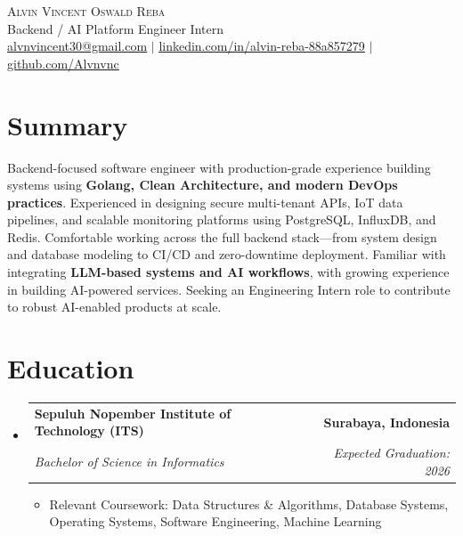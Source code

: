 \documentclass[letterpaper,11pt]{article}
\makeatletter
\newcommand{\resumeItem}[1]{
  \item\small{
    {#1 \vspace{-2pt}}
  }
}
\newcommand{\resumeSubheading}[4]{
  \vspace{-2pt}\item
    \begin{tabular*}{1.0\textwidth}[t]{l@{\extracolsep{\fill}}r}
      \textbf{#1} & \textbf{\small #2} \\
      \textit{\small#3} & \textit{\small #4} \\
    \end{tabular*}\vspace{-7pt}
}
\newcommand{\resumeSubHeadingListStart}{\begin{itemize}[leftmargin=0.0in, label={}]}
\newcommand{\resumeSubHeadingListEnd}{\end{itemize}}
\newcommand{\resumeItemListStart}{\begin{itemize}}
\newcommand{\resumeItemListEnd}{\end{itemize}\vspace{-5pt}}
\makeatother
\begin{document}
\begin{center}
    {\Huge \scshape Alvin Vincent Oswald Reba} \\ \vspace{1pt}
    \small Backend / AI Platform Engineer Intern \\ \vspace{8pt}
    \small 
    \href{mailto:alvnvincent30@gmail.com}{\underline{alvnvincent30@gmail.com}} $|$ 
    \href{https://linkedin.com/in/alvin-reba-88a857279}{\underline{linkedin.com/in/alvin-reba-88a857279}} $|$
    \href{https://github.com/Alvnvnc}{\underline{github.com/Alvnvnc}}
    \vspace{-8pt}
\end{center}


\section{Summary}
 \begin{itemize}[leftmargin=0.15in, label={}]
    \small{\item{
     Backend-focused software engineer with production-grade experience building systems using \textbf{Golang, Clean Architecture, and modern DevOps practices}. Experienced in designing secure multi-tenant APIs, IoT data pipelines, and scalable monitoring platforms using PostgreSQL, InfluxDB, and Redis. Comfortable working across the full backend stack—from system design and database modeling to CI/CD and zero-downtime deployment. Familiar with integrating \textbf{LLM-based systems and AI workflows}, with growing experience in building AI-powered services. Seeking an Engineering Intern role to contribute to robust AI-enabled products at scale.
    }}
 \end{itemize}
 \vspace{-16pt}


\section{Education}
  \resumeSubHeadingListStart
    \resumeSubheading
      {Sepuluh Nopember Institute of Technology (ITS)}{Surabaya, Indonesia}
      {Bachelor of Science in Informatics}{Expected Graduation: 2026}
      \resumeItemListStart
        \resumeItem{Relevant Coursework: Data Structures \& Algorithms, Database Systems, Operating Systems, Software Engineering, Machine Learning}
      \resumeItemListEnd
  \resumeSubHeadingListEnd
\vspace{-12pt}
\end{document}

